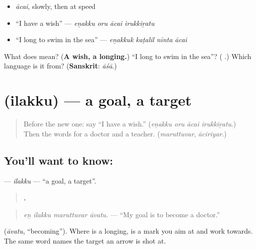 \begin{itemize}
\raggedright
  \item \emph{ācai}, slowly, then at speed
  \item \textquotedblleft{}I have a wish\textquotedblright{} — \emph{eṉakku oru ācai irukkiṟatu}
  \item \textquotedblleft{}I long to swim in the sea\textquotedblright{} — \emph{eṉakkuk kaṭalil nīnta ācai}
\end{itemize}

\begin{tcolorbox}[breakable,colback=teal!4,colframe=teal!35!black,title={Before you move on}]
What does \textbf{} mean? (\textbf{A wish, a longing.}) \textquotedblleft{}I long to swim in the sea\textquotedblright{}? (\textbf{   }.) Which language is it from? (\textbf{Sanskrit}: \emph{āśā}.)
\end{tcolorbox}
\section[\texorpdfstring{\ta{இலக்கு} (ilakku)}{இலக்கு (ilakku)}]{ (ilakku) — a goal, a target}

\label{lesson:TA-C290-ilakku}



\begin{quote}
Before the new one: say \textquotedblleft{}I have a wish.\textquotedblright{} (\emph{eṉakku oru ācai irukkiṟatu}.) Then the words for a doctor and a teacher. (\emph{maruttuvar}, \emph{āciriyar}.)
\end{quote}

\subsection*{You'll want to know: }
\textbf{} — \emph{ilakku} — \textquotedblleft{}a goal, a target\textquotedblright{}.

\begin{quote}
\textbf{   .}
\end{quote}

\begin{quote}
\emph{eṉ ilakku maruttuvar āvatu.} — \textquotedblleft{}My goal is to become a doctor.\textquotedblright{}
\end{quote}

\textbf{} (\emph{āvatu}, \textquotedblleft{}becoming\textquotedblright{}). Where \textbf{} is a longing, \textbf{} is a mark you aim at and work towards. The same word names the target an arrow is shot at.

